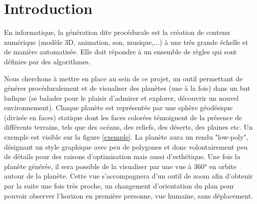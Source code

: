 \documentclass[a4paper]{article}
\begin{document}
\begin{titlepage}






\vfill %

\end{titlepage}

\newpage

\tableofcontents

\newpage

\section{Introduction}

En informatique, la génération dite procédurale est la création de contenu numérique (modèle 3D, animation, son, musique,...) à une très grande échelle et de manière automatisée. Elle doit répondre à un ensemble de règles qui sont définies par des algorithmes.\\
\par
Nous cherchons à mettre en place au sein de ce projet, un outil permettant de générer procéduralement et de visualiser des planètes (une à la fois) dans un but ludique (se balader pour le plaisir d'admirer et explorer, découvrir un nouvel environnement). Chaque planète est représentée par une sphère géodésique (divisée en faces) statique dont les faces colorées témoignent de la présence de différents terrains, tels que des océans, des reliefs, des déserts, des plaines etc. Un exemple est visible sur la figure \ref{exemple}. La planète aura un rendu "low-poly", désignant un style graphique avec peu de polygones et donc volontairement peu de détails pour des raisons d'optimisation mais aussi d'esthétique. Une fois la planète générée, il sera possible de la visualiser par une vue à 360° en orbite autour de la planète. Cette vue s'accompagnera d'un outil de zoom afin d'obtenir par la suite une fois très proche, un changement d'orientation du plan pour pouvoir observer l'horizon en première personne, vue humaine, sans déplacement.
\end{document}

